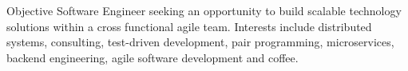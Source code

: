 \begin{section}{Objective}
  Software Engineer seeking an opportunity to build scalable technology solutions within a cross functional agile team. Interests include distributed systems, consulting, test-driven development, pair programming, microservices, backend engineering, agile software development and coffee.
\end{section}
